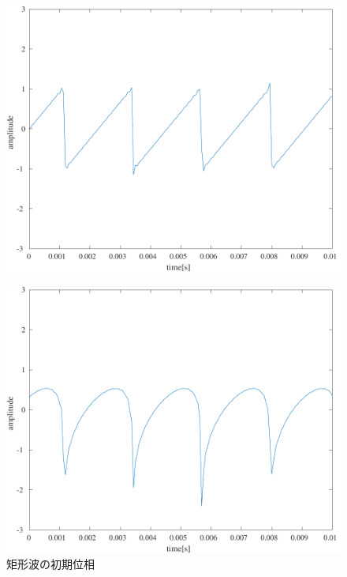 \begin{figure}[H]
\begin{minipage}[b]{.24\textwidth}
        \label{fig:実験結果矩形波_rand}
    \end{minipage}
    \caption{矩形波の初期位相}
    \label{fig:矩形波の初期位相}
    \begin{minipage}{.24\textwidth}
        \centering
        \includegraphics[keepaspectratio,width=\textwidth]{../../Figures/03_21_nokogiri.pdf}
        \label{fig:実験結果ノコギリ波_pure}
    \end{minipage}
    \begin{minipage}{.24\textwidth}
        \centering
        \includegraphics[keepaspectratio,width=\textwidth]{../../Figures/03_22.pdf}

\end{minipage}
\end{figure}
